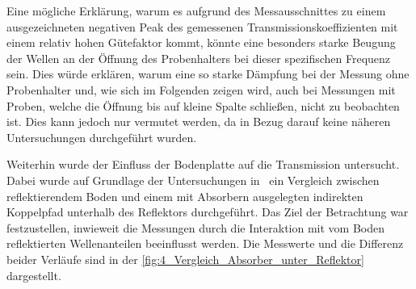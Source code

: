 Eine mögliche Erklärung, warum es aufgrund des Messausschnittes zu einem ausgezeichneten negativen Peak des gemessenen Transmissionskoeffizienten mit einem relativ hohen Gütefaktor kommt, könnte eine besonders starke Beugung der Wellen an der Öffnung des Probenhalters bei dieser spezifischen Frequenz sein. Dies würde erklären, warum eine so starke Dämpfung bei der Messung ohne Probenhalter und, wie sich im Folgenden zeigen wird, auch bei Messungen mit Proben, welche die Öffnung bis auf kleine Spalte schließen, nicht zu beobachten ist. Dies kann jedoch nur vermutet werden, da in Bezug darauf keine näheren Untersuchungen durchgeführt wurden. 
\par
\vspace{\linespace}
\newpage
Weiterhin wurde der Einfluss der Bodenplatte auf die Transmission untersucht. Dabei wurde auf Grundlage der Untersuchungen in~\cite{Vergleich_Absorberhalle_Groundplane} ein Vergleich zwischen reflektierendem Boden und einem mit Absorbern ausgelegten indirekten Koppelpfad unterhalb des Reflektors durchgeführt. Das Ziel der Betrachtung war festzustellen, inwieweit die Messungen durch die Interaktion mit vom Boden reflektierten Wellenanteilen beeinflusst werden. Die Messwerte und die Differenz beider Verläufe sind in der \Abb\ref{fig:4_Vergleich_Absorber_unter_Reflektor} dargestellt.
\par
\vspace{\linespace}


